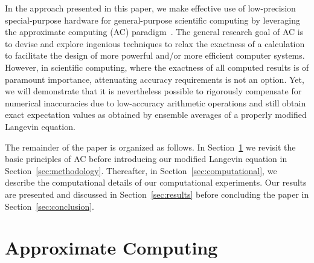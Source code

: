 \documentclass[format=acmsmall,urlbreakonhyphens]{acmart}
\begin{document}

In the approach presented in this paper, we make effective use of low-precision special-purpose hardware for general-purpose scientific computing by leveraging the approximate computing (AC) paradigm~\cite{KlavikMalossiBekasEtAl2014, PlesslAC}. The general research goal of AC is to devise and explore ingenious techniques to relax the exactness of a calculation to facilitate the design of more powerful and/or more efficient computer systems. However, in scientific computing, where the exactness of all computed results is of paramount importance, attenuating accuracy requirements is not an option. Yet, we will demonstrate that it is nevertheless possible to rigorously compensate for numerical inaccuracies due to low-accuracy arithmetic operations and still obtain exact expectation values as obtained by ensemble averages of a properly modified Langevin equation.


The remainder of the paper is organized as follows. In Section~\ref{sec:ac} we revisit the basic principles of AC before introducing our modified Langevin equation in Section~\ref{sec:methodology}. Thereafter, in Section~\ref{sec:computational}, we describe the computational details of our computational experiments. Our results are presented and discussed in Section~\ref{sec:results} before concluding the paper in Section~\ref{sec:conclusion}.


\section{Approximate Computing}
\label{sec:ac}
\end{document}
